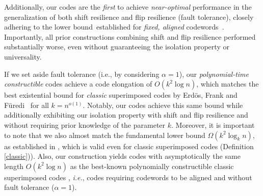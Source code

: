 \documentclass[11pt]{article}
\begin{document}
Additionally, our codes are the \textit{first} to achieve \textit{near-optimal} 
performance in the generalization of both shift resilience and flip resilience (fault tolerance),
closely adhering to the lower bound~established for \textit{fixed, aligned} codewords~\cite{RV2024}.
{Importantly, all prior constructions combining shift and flip resilience performed substantially worse, even without guaranteeing the isolation property or universality.}

If we set aside fault tolerance (i.e., by considering $\alpha = 1$), our \textit{polynomial-time constructible} 
codes achieve a {code elongation} of $O(k^2 \log n)$, which matches the best existential bound 
for \textit{classic}
superimposed codes by Erd{\"o}s, Frank and F{\"u}redi~\cite{EFF1982} for all $k = n^{o(1)}$. 
Notably, our codes achieve this same bound while additionally exhibiting 
{our isolation property with shift and flip resilience and without 
requiring prior knowledge of the parameter $k$}. Moreover, it is important to note that we also almost
match the fundamental lower bound $\Omega(k^2 \log_k n)$, as established in 
\cite{AV1982, R1994, F1996, AA2005}, 
which is valid even for classic superimposed codes (Definition \ref{classic})). 
Also, our construction yields codes with asymptotically the same length $O(k^2 \log n)$ as the best-known 
polynomially constructible classic superimposed codes \cite{PR11}, \textit{i.e.}, codes requiring codewords 
to be aligned and without fault tolerance ($\alpha = 1$).


\iffalse
In Section~\ref{sec:applications} we show how to apply the ultra-resilient superimposed codes to solve 
contention resolution problem on a multiple-access channel.
The best deterministic protocol so far, was existential -- there are transmission sequences guaranteeing 
latency $O(k^2\log n)$ of each station arriving at arbitrary time, 
where $k$ is the maximum number of stations joining the channel~\cite{DEMARCO20231}. 
Using our polynomially constructible codes, we show that now we can efficiently solve contention 
resolution problem with the same asymptotic latency.
We also argue how to improve several other distributed problems, in which synchronization 
(that would have allowed using e.g., classic superimposed codes) could be costly.
\fi

\B
\end{document}
